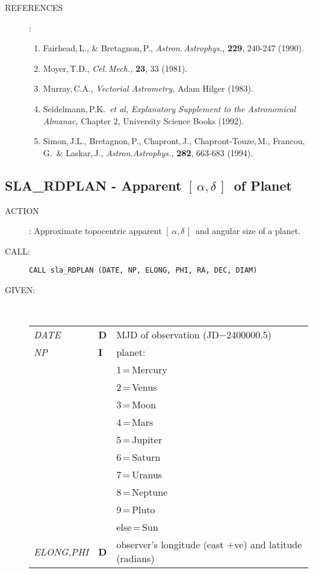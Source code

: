 \documentclass[11pt,twoside]{article}
\newcommand{\xlabel}[1]{}
\newcommand{\radec}     {$[\,\alpha,\delta\,]$}
\newcommand{\routine}[3]
{\hbadness=10000
  \vbox
  {
    \rule{\textwidth}{0.3mm}\\
    {\Large {\bf #1} \hfill #2 \hfill {\bf #1}}\\
    \setlength{\oldspacing}{\topsep}
    \setlength{\topsep}{0.3ex}
    \begin{description}
      #3
    \end{description}
    \setlength{\topsep}{\oldspacing}
  }
}
\renewcommand{\routine}[3]
   {
      \subsection{#1\xlabel{#1} - #2\label{#1}}
       \begin{description}
         #3
       \end{description}
   }
\newcommand{\action}[1]
{\item[ACTION]: #1}
\newcommand{\action}[1]
   {\item[ACTION:] #1}
\newcommand{\call}[1]
{\item[CALL]: \hspace{0.4em}{\tt #1}}
\newlength{\oldspacing}
\renewcommand{\call}[1]
   {
    \item[CALL:] {\tt #1}
   }
\newcommand{\args}[2]
{
  \goodbreak
  \setlength{\oldspacing}{\topsep}
  \setlength{\topsep}{0.3ex}
  \begin{description}
  \item[#1]:\\[1.5ex]
    \begin{tabular}{p{7em}p{6em}p{22em}}
      #2
    \end{tabular}
  \end{description}
  \setlength{\topsep}{\oldspacing}
}
\renewcommand{\args}[2]
   {
     \begin{description}
        \item[#1:]\\
        \begin{tabular}{p{7em}p{6em}l}
           #2
        \end{tabular}
     \end{description}
   }
\newcommand{\spec}[3]
{
  {\em {#1}} & {\bf \mbox{#2}} & {#3}
}
\newcommand{\refs}[1]
{
  \goodbreak
  \setlength{\oldspacing}{\topsep}
  \setlength{\topsep}{0.3ex}
  \begin{description}
    \item[REFERENCES]:
        #1
  \end{description}
  \setlength{\topsep}{\oldspacing}
}
\newcommand{\refs}[1]
   {
     \begin{description}
       \item[REFERENCES:]
           #1
     \end{description}
   }
\begin{document}
\refs
{
 \begin{enumerate}
  \item Fairhead,\,L., \& Bretagnon,\,P., {\it Astron.\,Astrophys.,}\/
        {\bf 229}, 240-247 (1990).
  \item Moyer,\,T.D., {\it Cel.\,Mech.,}\/ {\bf 23}, 33 (1981).
  \item Murray,\,C.A., {\it Vectorial Astrometry,}\/ Adam Hilger (1983).
  \item Seidelmann,\,P.K.\ {\it et al,}\/ {\it Explanatory Supplement to the
        Astronomical Almanac,}\/ Chapter 2, University Science Books
        (1992).
  \item Simon,\,J.L., Bretagnon,\,P., Chapront,\,J., Chapront-Touze,\,M.,
        Francou,\,G.\ \& Laskar,\,J., {\it Astron.Astrophys.,}\/
        {\bf 282}, 663-683 (1994).
 \end{enumerate}
}
\routine{SLA\_RDPLAN}{Apparent \radec\ of Planet}
{
 \action{Approximate topocentric apparent \radec\ and angular
         size of a planet.}
 \call{CALL sla\_RDPLAN (DATE, NP, ELONG, PHI, RA, DEC, DIAM)}
}
\args{GIVEN}
{
 \spec{DATE}{D}{MJD of observation (JD$-$2400000.5)} \\
 \spec{NP}{I}{planet:} \\
 \spec{}{}{\hspace{1.5em} 1\,=\,Mercury} \\
 \spec{}{}{\hspace{1.5em} 2\,=\,Venus} \\
 \spec{}{}{\hspace{1.5em} 3\,=\,Moon} \\
 \spec{}{}{\hspace{1.5em} 4\,=\,Mars} \\
 \spec{}{}{\hspace{1.5em} 5\,=\,Jupiter} \\
 \spec{}{}{\hspace{1.5em} 6\,=\,Saturn} \\
 \spec{}{}{\hspace{1.5em} 7\,=\,Uranus} \\
 \spec{}{}{\hspace{1.5em} 8\,=\,Neptune} \\
 \spec{}{}{\hspace{1.5em} 9\,=\,Pluto} \\
 \spec{}{}{\hspace{0.44em} else\,=\,Sun} \\
 \spec{ELONG,PHI}{D}{observer's longitude (east +ve) and latitude
                     (radians)}
}
\end{document}
